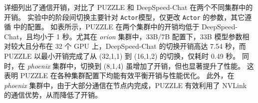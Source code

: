  详细列出了通信开销，对比了 PUZZLE 和 DeepSpeed-Chat 在两个不同集群中的开销。
实验中的阶段间切换主要针对 \texttt{Actor}模型，仅更改 \texttt{Actor} 的参数，其它遵循 中的配置。  
如表所示，PUZZLE 在两个集群中的开销均低于 DeepSpeed-Chat，且均小于 1 秒。尤其在 \textit{orion} 集群中，33B/7B 配置下，33B 模型参数相对较大且分布在 32 个 GPU 上，DeepSpeed-Chat 的切换开销高达 7.54 秒，而 PUZZLE 以最小开销完成了从 (32,1,1) 到 (16,1,2) 的切换，仅耗时 0.49 秒。
同时，在 \textit{phoenix} 集群中，切换到 (8,1,4) 虽增加了开销，但也显著提升了性能。
这表明 PUZZLE 在各种集群配置下均能有效平衡开销与性能优化。
此外，在 \textit{phoenix} 集群中，由于大部分通信在节点内完成，PUZZLE 有效利用了 NVLink 的通信优势，从而降低了开销。

